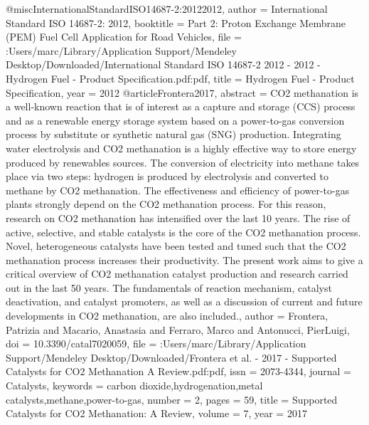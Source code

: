 @misc{InternationalStandardISO14687-2:20122012,
author = {{International Standard ISO 14687-2: 2012}},
booktitle = {Part 2: Proton Exchange Membrane (PEM) Fuel Cell Application for Road Vehicles},
file = {:Users/marc/Library/Application Support/Mendeley Desktop/Downloaded/International Standard ISO 14687-2 2012 - 2012 - Hydrogen Fuel - Product Specification.pdf:pdf},
title = {{Hydrogen Fuel - Product Specification}},
year = {2012}
}
@article{Frontera2017,
abstract = {CO2 methanation is a well-known reaction that is of interest as a capture and storage (CCS) process and as a renewable energy storage system based on a power-to-gas conversion process by substitute or synthetic natural gas (SNG) production. Integrating water electrolysis and CO2 methanation is a highly effective way to store energy produced by renewables sources. The conversion of electricity into methane takes place via two steps: hydrogen is produced by electrolysis and converted to methane by CO2 methanation. The effectiveness and efficiency of power-to-gas plants strongly depend on the CO2 methanation process. For this reason, research on CO2 methanation has intensified over the last 10 years. The rise of active, selective, and stable catalysts is the core of the CO2 methanation process. Novel, heterogeneous catalysts have been tested and tuned such that the CO2 methanation process increases their productivity. The present work aims to give a critical overview of CO2 methanation catalyst production and research carried out in the last 50 years. The fundamentals of reaction mechanism, catalyst deactivation, and catalyst promoters, as well as a discussion of current and future developments in CO2 methanation, are also included.},
author = {Frontera, Patrizia and Macario, Anastasia and Ferraro, Marco and Antonucci, PierLuigi},
doi = {10.3390/catal7020059},
file = {:Users/marc/Library/Application Support/Mendeley Desktop/Downloaded/Frontera et al. - 2017 - Supported Catalysts for CO2 Methanation A Review.pdf:pdf},
issn = {2073-4344},
journal = {Catalysts},
keywords = {carbon dioxide,hydrogenation,metal catalysts,methane,power-to-gas},
number = {2},
pages = {59},
title = {{Supported Catalysts for CO2 Methanation: A Review}},
volume = {7},
year = {2017}
}

